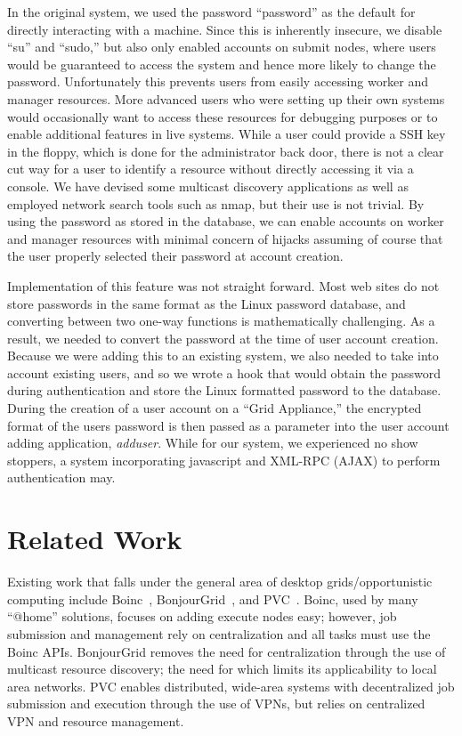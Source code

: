 \documentclass[twocolumn]{svjour3}
\begin{document}
In the original system, we used the password ``password'' as the default for
directly interacting with a machine.  Since this is inherently insecure, we
disable ``su'' and ``sudo,'' but also only enabled accounts on submit nodes,
where users would be guaranteed to access the system and hence more likely to
change the password.  Unfortunately this prevents users from easily accessing
worker and manager resources.  More advanced users who were setting up their
own systems would occasionally want to access these resources for debugging
purposes or to enable additional features in live systems.  While a user could
provide a SSH key in the floppy, which is done for the administrator back door,
there is not a clear cut way for a user to identify a resource without directly
accessing it via a console.  We have devised some multicast discovery
applications as well as employed network search tools such as nmap, but their
use is not trivial.  By using the password as stored in the database, we can
enable accounts on worker and manager resources with minimal concern of hijacks
assuming of course that the user properly selected their password at account
creation.

Implementation of this feature was not straight forward.  Most web sites do not
store passwords in the same format as the Linux password database, and
converting between two one-way functions is mathematically challenging.  As a
result, we needed to convert the password at the time of user account creation.
Because we were adding this to an existing system, we also needed to take into
account existing users, and so we wrote a hook that would obtain the password
during authentication and store the Linux formatted password to the database.
During the creation of a user account on a ``Grid Appliance,'' the encrypted
format of the users password is then passed as a parameter into the user
account adding application, {\em adduser}.  While for our system, we
experienced no show stoppers, a system incorporating javascript and XML-RPC
(AJAX) to perform authentication may.

\section{Related Work}
\label{related_work}

Existing work that falls under the general area of desktop grids/opportunistic
computing include Boinc~\cite{boinc}, BonjourGrid~\cite{bonjourgrid}, and
PVC~\cite{pvc}.  Boinc, used by many ``@home'' solutions, focuses on adding
execute nodes easy; however, job submission and management rely on
centralization and all tasks must use the Boinc APIs.  BonjourGrid removes the
need for centralization through the use of multicast resource discovery; the
need for which limits its applicability to local area networks.  PVC enables
distributed, wide-area systems with decentralized job submission and execution
through the use of VPNs, but relies on centralized VPN and resource management.
\end{document}
